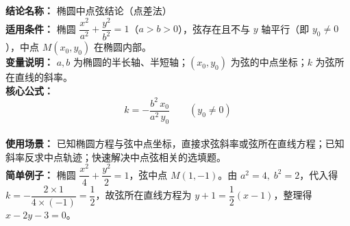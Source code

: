 \textbf{结论名称：} 椭圆中点弦结论（点差法）\\
\textbf{适用条件：} 椭圆 $\dfrac{x^2}{a^2}+\dfrac{y^2}{b^2}=1$（$a>b>0$），弦存在且不与 $y$ 轴平行（即 $y_0\neq0$），中点 $M(x_0,y_0)$ 在椭圆内部。\\
\textbf{变量说明：} $a,b$ 为椭圆的半长轴、半短轴；$(x_0,y_0)$ 为弦的中点坐标；$k$ 为弦所在直线的斜率。\\
\textbf{核心公式：} \[ \boxed{k=-\frac{b^2\,x_0}{a^2\,y_0}}\qquad(y_0\neq0) \]\\
\textbf{使用场景：} 已知椭圆方程与弦中点坐标，直接求弦斜率或弦所在直线方程；已知斜率反求中点轨迹；快速解决中点弦相关的选填题。\\
\textbf{简单例子：} 椭圆 $\dfrac{x^2}{4}+\dfrac{y^2}{2}=1$，弦中点 $M(1,-1)$。由 $a^2=4,\;b^2=2$，代入得 $k=-\dfrac{2\times1}{4\times(-1)}=\dfrac12$，故弦所在直线方程为 $y+1=\dfrac12(x-1)$，整理得 $x-2y-3=0$。
